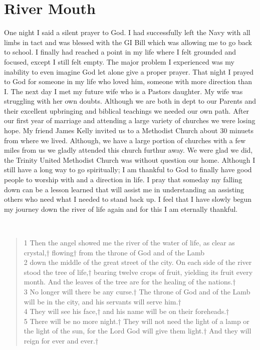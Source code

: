 \documentclass[11pt,a4paper]{scrartcl} %
\begin{document}
\section{River Mouth}
\begin{doublespace}
One night I said a silent prayer to God. I had successfully left the Navy with all limbs in tact and was blessed with the GI Bill which was allowing me to go back to school. I finally had reached a point in my life where I felt grounded and focused, except I still felt empty. The major problem I experienced was my inability to even imagine God let alone give a proper prayer. That night I prayed to God for someone in my life who loved him, someone with more direction than I. The next day I met my future wife who is a Pastors daughter. My wife was struggling with her own doubts. Although we are both in dept to our Parents and their excellent upbringing and biblical teachings we needed our own path. After our first year of marriage and attending a large variety of churches we were losing hope. My friend James Kelly invited us to a Methodist Church about 30 minuets from where we lived. Although, we have a large portion of churches with a few miles from us we gladly attended this church furthur away. We were glad we did, the Trinity United Methodist Church was without question our home.  Although I still have a long way to go spiritually; I am thankful to God to finally have good people to worship with and a direction in life. I pray that someday my falling down can be a lesson learned that will assist me in understanding an assisting others who need what I needed to stand back up. I feel that I have slowly begun my journey down the river of life again and for this I am eternally thankful. 
\end{doublespace}
\clearpage
\textcolor{Sepia}{}~\citep{niv}\\
\begin{verse}
1 Then the angel showed me the river of the water of life, as clear as crystal,† flowing† from the throne of God and of the Lamb\\ 
2 down the middle of the great street of the city. On each side of the river stood the tree of life,† bearing twelve crops of fruit, yielding its fruit every month. And the leaves of the tree are for the healing of the nations.† \\
3 No longer will there be any curse.† The throne of God and of the Lamb will be in the city, and his servants will serve him.† \\
4 They will see his face,† and his name will be on their foreheads.† \\
5 There will be no more night.† They will not need the light of a lamp or the light of the sun, for the Lord God will give them light.† And they will reign for ever and ever.† 
\end{verse}
\clearpage
    \nocite{*}
    
    
\end{document}
